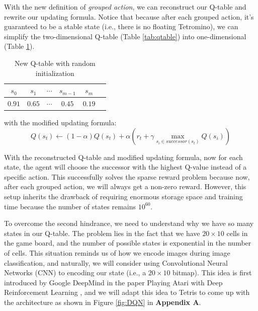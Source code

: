 \documentclass[letterpaper]{article} %
\begin{document}
With the new definition of \textit{grouped action}, we can reconstruct our Q-table and rewrite our updating formula. Notice that because after each grouped action, it's guaranteed to be a stable state (i.e., there is no floating Tetromino), we can simplify the two-dimensional Q-table (Table \ref{tab:qtable}) into one-dimensional (Table \ref{tab:newqtable}).

\begin{table}[h!]
  \centering
  \normalsize{
    \begin{tabular}{ |c|c|c|c|c|c| } 
      \hline
      $s_{0}$ & $s_{1}$ & $\cdots$ & $s_{m-1}$ & $s_{m}$  \\ 
      \hline
      $0.91$ & $0.65$ &$\cdots $ &$0.45$ &$0.19$  \\ 
       \hline
      \end{tabular}}
  \caption{New Q-table with random initialization}
  \label{tab:newqtable}
\end{table}

with the modified updating formula:
\[
    Q(s_{t}) \leftarrow (1-\alpha) Q(s_{t}) + \alpha   \left ( r_{t} + \gamma  \max_{s_{i} \in successor(s_{t})}Q(s_{i})\right ) 
\]

With the reconstructed Q-table and modified updating formula, now for each state, the agent will choose the successor with the highest Q-value instead of a specific action. This successfully solves the sparse reward problem because now, after each grouped action, we will always get a non-zero reward. However, this setup inherits the drawback of requiring enormous storage space and training time because the number of states remains $10^{60}$. 

To overcome the second hindrance, we need to understand why we have so many states in our Q-table. The problem lies in the fact that we have $20\times 10$ cells in the game board, and the number of possible states is exponential in the number of cells. This situation reminds us of how we encode images during image classification, and naturally, we will consider using Convolutional Neural Networks (CNN) to encoding our state (i.e., a $20\times 10$ bitmap).  This idea is first introduced by Google DeepMind in the paper Playing Atari with Deep Reinforcement Learning \cite{Mnih_2013}, and we will adapt this idea to Tetris to come up with the architecture as shown in Figure \ref{fig:DQN} in \textbf{Appendix A}.
\end{document}
